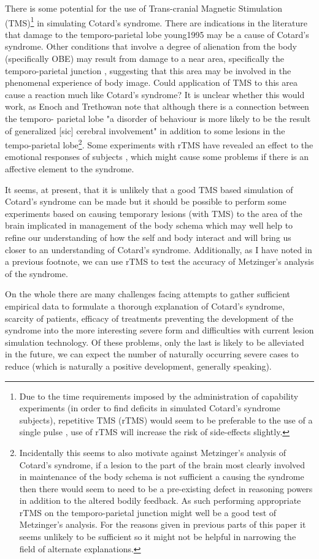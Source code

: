 There is some potential for the use of Trans-cranial Magnetic Stimulation (TMS)\footnote{Due to the time requirements imposed by the administration of capability experiments (in order to find deficits in simulated Cotard's syndrome subjects), repetitive TMS (rTMS) would seem to be preferable to the use of a single pulse \cite[p. 297]{weiner2003handbook}, use of rTMS will increase the risk of side-effects slightly.} in simulating Cotard's syndrome. There are indications in the literature that damage to the temporo-parietal lobe \cite{enoch1991}{young1995} may be a cause of Cotard's syndrome. Other conditions that involve a degree of alienation from the body (specifically OBE) may result from damage to a near area, specifically the temporo-parietal junction \cite{blanke2005}, suggesting that this area may be involved in the phenomenal experience of body image. Could application of TMS to this area cause a reaction much like Cotard's syndrome? It is unclear whether this would work, as Enoch and Trethowan note that although there is a connection between the temporo- parietal lobe "a disorder of behaviour is more likely to be the result of generalized [sic] cerebral involvement" \cite[p. 177]{enoch1991} in addition to some lesions in the tempo-parietal lobe\footnote{Incidentally this seems to also motivate against Metzinger's analysis of Cotard's syndrome, if a lesion to the part of the brain most clearly involved in maintenance of the body schema is not sufficient a causing the syndrome then there would seem to need to be a pre-existing defect in reasoning powers in addition to the altered bodily feedback. As such performing appropriate rTMS on the temporo-parietal junction might well be a good test of Metzinger's analysis. For the reasons given in previous parts of this paper it seems  unlikely to be sufficient so it might not be helpful in narrowing the field of alternate explanations.}. Some experiments with rTMS have revealed an effect to the emotional responses of subjects \cite{wasserman2000}, which might cause some problems if there is an affective element to the syndrome.

It seems, at present, that it is unlikely that a good TMS based simulation of Cotard's syndrome can be made but it should be possible to perform some experiments based on causing temporary lesions (with TMS) to the area of the brain implicated in management of the body schema which may well help to refine our understanding of how the self and body interact and will bring us closer to an understanding of Cotard's syndrome. Additionally, as I have noted in a previous footnote, we can use rTMS to test the accuracy of Metzinger's analysis of the syndrome.

On the whole there are many challenges facing attempts to gather sufficient empirical data to formulate a thorough explanation of Cotard's syndrome, scarcity of patients, efficacy of treatments preventing the development of the syndrome into the more interesting severe form and difficulties with current lesion simulation technology. Of these problems, only the last is likely to be alleviated in the future, we can expect the number of naturally occurring severe cases to reduce (which is naturally a positive development, generally speaking).